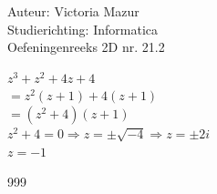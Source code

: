 \documentclass[a4paper,fleqn]{article}
\begin{document}
\noindent \large Auteur: Victoria Mazur \\
\noindent \large Studierichting: Informatica\\
\noindent \large Oefeningenreeks 2D nr. 21.2\\

\medskip

\normalsize

$z^3 + z^2 + 4z + 4$\\

$= z^2 (z+1) + 4(z+1)$\\

$= (z^2 + 4)(z+1)$\\

$z^2 + 4 = 0 \Rightarrow z = \pm \sqrt{-4} \Rightarrow z = \pm 2i$\\

$z = -1$

\begin{thebibliography}{999}
\end{thebibliography}
\end{document}
